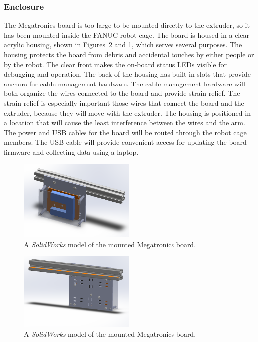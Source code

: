 \subsubsection{Enclosure}

\indent

The Megatronics board is too large to be mounted directly to the extruder, so it has been mounted inside the FANUC robot cage. The board is housed in a clear acrylic housing, shown in Figures~\ref{fig:megatronics-mount-front} and \ref{fig:megatronics-mount-back}, which serves several purposes. The housing protects the board from debris and accidental touches by either people or by the robot. The clear front makes the on-board status LEDs visible for debugging and operation. The back of the housing has built-in slots that provide anchors for cable management hardware. The cable management hardware will both organize the wires connected to the board and provide strain relief. The strain relief is especially important those wires that connect the board and the extruder, because they will move with the extruder. The housing is positioned in a location that will cause the least interference between the wires and the arm. The power and USB cables for the board will be routed through the robot cage members. The USB cable will provide convenient access for updating the board firmware and collecting data using a laptop. 

\begin{figure}[htp]
\centering
\includegraphics[width=0.5\textwidth]{./figures/megatronics-mount-1}
\caption{A \emph{SolidWorks} model of the mounted Megatronics board.}
\label{fig:megatronics-mount-back}
\end{figure}

\begin{figure}[htp]
\centering
\includegraphics[width=0.5\textwidth]{./figures/megatronics-mount-2}
\caption{A \emph{SolidWorks} model of the mounted Megatronics board.}
\label{fig:megatronics-mount-front}
\end{figure}


